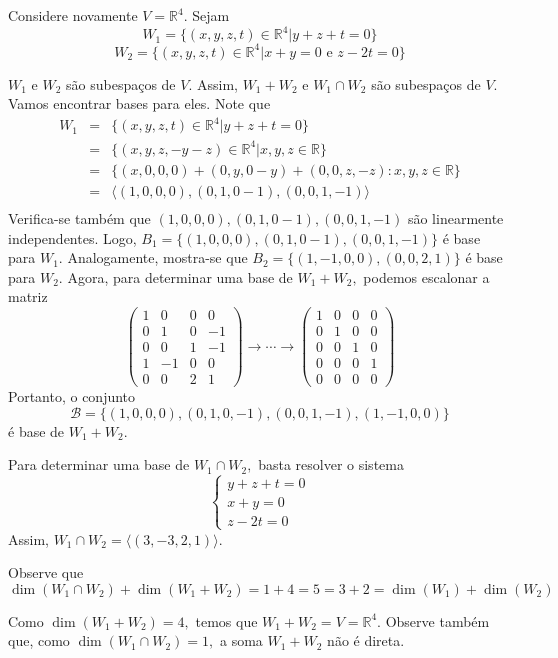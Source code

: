 \documentclass[11pt,twoside,a4paper]{book}
\begin{document}
\begin{exemplo}
Considere novamente $V = \mathbb{R}^4$. Sejam
\[
W_1 = \{(x,y,z,t) \in \mathbb{R}^4 | y + z + t = 0 \}
\]
\[
W_2 = \{(x,y,z,t) \in \mathbb{R}^4 | x +y = 0 \mbox{ e } z - 2t = 0 \}
\]

$W_1$ e $W_2$ são subespaços de $V.$ Assim, $W_1 + W_2$ e $W_1 \cap W_2$ são subespaços de $V.$ Vamos encontrar bases para eles.
Note que 
\[
\begin{array}{lcl}
W_1 &=& \{(x,y,z,t) \in \mathbb{R}^4 | y + z + t = 0 \} \\
&=& \{(x,y,z,-y-z) \in \mathbb{R}^4 | x,y,z \in \mathbb{R} \} \\
&=& \{ (x,0,0,0) + (0,y,0-y) + (0,0,z,-z) : x,y,z \in \mathbb{R} \} \\
&=& \langle (1,0,0,0), (0,1,0-1), (0,0,1,-1) \rangle\\
\end{array}
\]
Verifica-se também que $(1,0,0,0), (0,1,0-1), (0,0,1,-1)$ são linearmente independentes. Logo, $B_1 = \{ (1,0,0,0), (0,1,0-1), (0,0,1,-1) \}$ é base para $W_1.$
Analogamente, mostra-se que $B_2 = \{ (1,-1,0,0), (0,0,2,1) \}$ é base para $W_2.$
Agora, para determinar uma base de $W_1 + W_2,$ podemos escalonar a matriz
\[
\left( \begin{array}{cccc}
1 & 0 & 0 & 0\\
0 & 1 & 0 & -1 \\
0 & 0 & 1 & -1 \\
1 & -1 & 0 & 0\\
0 & 0 & 2 & 1

\end{array} \right) \rightarrow \cdots \rightarrow \left( \begin{array}{cccc}
1 & 0 & 0 & 0\\
0 & 1 & 0 & 0 \\
0 & 0 & 1 & 0 \\
0& 0& 0 & 1\\
0 & 0 & 0 & 0

\end{array} \right)
\]
Portanto, o conjunto
\[
\mathcal{B} = \{ (1,0,0,0), (0,1,0,-1),(0,0,1,-1),(1,-1,0,0) \}\]
é base de $W_1 + W_2.$

Para determinar uma base de $W_1 \cap W_2,$ basta resolver o sistema
\[
\left\{ \begin{array}{l}
y+z+t = 0 \\x+y = 0 \\z - 2t = 0
\end{array} \right.
\]
Assim, $W_1 \cap W_2 = \langle (3,-3,2,1) \rangle.$

Observe que
\[
\dim(W_1 \cap W_2) + \dim(W_1 + W_2) = 1 + 4 = 5 = 3 + 2 = \dim(W_1) + \dim(W_2)
\]

Como $\dim(W_1 + W_2) = 4,$ temos que $W_1 + W_2 = V = \mathbb{R}^4.$
Observe também que, como $\dim(W_1 \cap W_2) = 1,$ a soma $W_1 + W_2$ não é direta. 
\end{exemplo}
\end{document}
